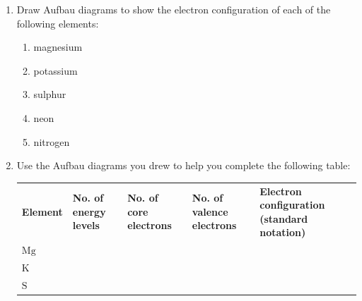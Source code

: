         \label{m38741*id260063}\begin{enumerate}[noitemsep, label=\textbf{\arabic*}. ] 
            \label{m38741*uid106}\item Draw Aufbau diagrams to show the electron configuration of each of the following elements:
\label{m38741*id260079}\begin{enumerate}[noitemsep, label=\textbf{\alph*}. ] 
            \label{m38741*uid107}\item magnesium
\label{m38741*uid108}\item potassium
\label{m38741*uid109}\item sulphur
\label{m38741*uid110}\item neon
\label{m38741*uid111}\item nitrogen
\end{enumerate}
        \label{m38741*uid112}\item Use the Aufbau diagrams you drew to help you complete the following table:
          \begin{table}[H]
        \begin{center}
      \label{m38741*id260157}
    \noindent
      \tablelasttail{}
      \begin{xtabular}[t]{|l|l|l|l|l|}\hline
        \textbf{Element} &
        \textbf{No. of energy levels} &
        \textbf{No. of core electrons} &
        \textbf{No. of valence electrons} &
        \textbf{Electron configuration (standard notation)}%
     \tabularnewline{}
        $\mathrm{Mg}$ &
         &
         &
         &
     \tabularnewline{}
        $\mathrm{K}$ &
         &
         &
         &
     \tabularnewline{}
        $\mathrm{S}$ &
         &

\end{xtabular}
\end{center}
\end{table}
\end{enumerate}
